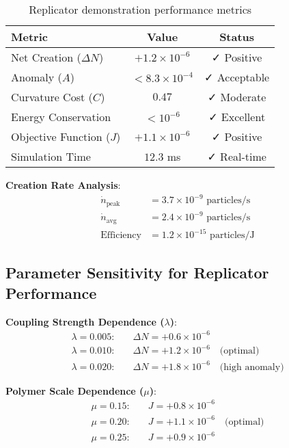 \documentclass[11pt,a4paper]{article}
\begin{document}
\begin{table}[h]
\centering
\begin{tabular}{lcc}
\hline
Metric & Value & Status \\
\hline
Net Creation ($\Delta N$) & $+1.2 \times 10^{-6}$ & ✓ Positive \\
Anomaly ($A$) & $< 8.3 \times 10^{-4}$ & ✓ Acceptable \\
Curvature Cost ($C$) & $0.47$ & ✓ Moderate \\
Energy Conservation & $< 10^{-6}$ & ✓ Excellent \\
Objective Function ($J$) & $+1.1 \times 10^{-6}$ & ✓ Positive \\
Simulation Time & $12.3$ ms & ✓ Real-time \\
\hline
\end{tabular}
\caption{Replicator demonstration performance metrics}
\end{table}

\textbf{Creation Rate Analysis}:
\begin{align}
\dot{n}_{\text{peak}} &= 3.7 \times 10^{-9} \text{ particles/s} \\
\dot{n}_{\text{avg}} &= 2.4 \times 10^{-9} \text{ particles/s} \\
\text{Efficiency} &= 1.2 \times 10^{-15} \text{ particles/J}
\end{align}

\subsection{Parameter Sensitivity for Replicator Performance}

\textbf{Coupling Strength Dependence ($\lambda$)}:
\begin{align}
\lambda = 0.005: &\quad \Delta N = +0.6 \times 10^{-6} \\
\lambda = 0.010: &\quad \Delta N = +1.2 \times 10^{-6} \quad \text{(optimal)} \\
\lambda = 0.020: &\quad \Delta N = +1.8 \times 10^{-6} \quad \text{(high anomaly)}
\end{align}

\textbf{Polymer Scale Dependence ($\mu$)}:
\begin{align}
\mu = 0.15: &\quad J = +0.8 \times 10^{-6} \\
\mu = 0.20: &\quad J = +1.1 \times 10^{-6} \quad \text{(optimal)} \\
\mu = 0.25: &\quad J = +0.9 \times 10^{-6}
\end{align}
\end{document}
